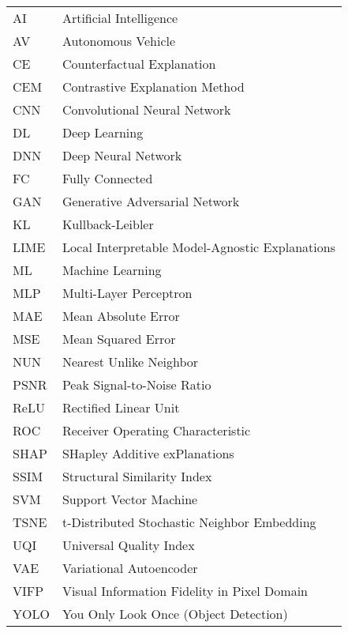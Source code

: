 \begin{center}
\renewcommand{\arraystretch}{1.2}
\begin{tabular}{ll}
AI & Artificial Intelligence \\
AV & Autonomous Vehicle \\
CE & Counterfactual Explanation \\
CEM & Contrastive Explanation Method \\
CNN & Convolutional Neural Network \\
DL & Deep Learning \\
DNN & Deep Neural Network \\
FC & Fully Connected \\
GAN & Generative Adversarial Network \\
KL & Kullback-Leibler \\
LIME & Local Interpretable Model-Agnostic Explanations \\
ML & Machine Learning \\
MLP & Multi-Layer Perceptron \\
MAE & Mean Absolute Error \\
MSE & Mean Squared Error \\
NUN & Nearest Unlike Neighbor \\
PSNR & Peak Signal-to-Noise Ratio \\
ReLU & Rectified Linear Unit \\
ROC & Receiver Operating Characteristic \\
SHAP & SHapley Additive exPlanations \\
SSIM & Structural Similarity Index \\
SVM & Support Vector Machine \\
TSNE & t-Distributed Stochastic Neighbor Embedding \\
UQI & Universal Quality Index \\
VAE & Variational Autoencoder \\
VIFP & Visual Information Fidelity in Pixel Domain \\
YOLO & You Only Look Once (Object Detection) \\
\end{tabular}
\end{center}
